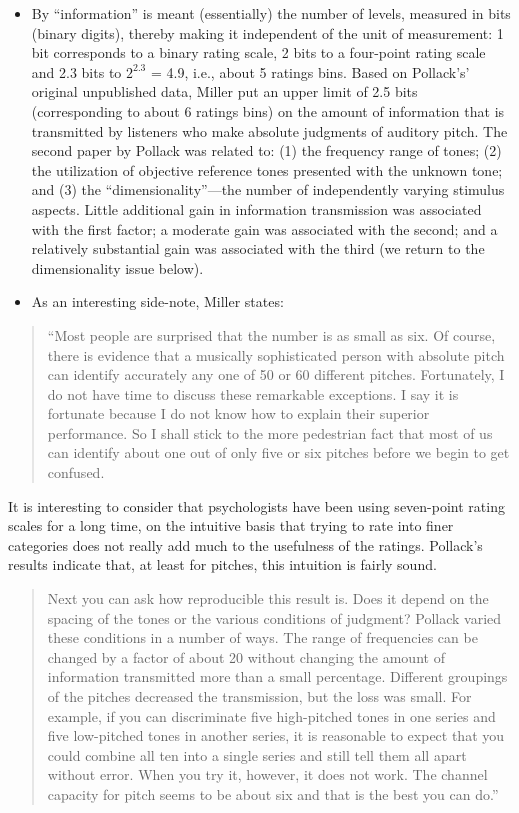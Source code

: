 \documentclass[
]{book}
\begin{document}
\begin{itemize}
\item
  By ``information'' is meant (essentially) the number of levels, measured in bits (binary digits), thereby making it independent of the unit of measurement: 1 bit corresponds to a binary rating scale, 2 bits to a four-point rating scale and 2.3 bits to \(2^{2.3}\) = 4.9, i.e., about 5 ratings bins. Based on Pollack's' original unpublished data, Miller put an upper limit of 2.5 bits (corresponding to about 6 ratings bins) on the amount of information that is transmitted by listeners who make absolute judgments of auditory pitch. The second paper \citep[@][]{RN2474} by Pollack was related to: (1) the frequency range of tones; (2) the utilization of objective reference tones presented with the unknown tone; and (3) the ``dimensionality''---the number of independently varying stimulus aspects. Little additional gain in information transmission was associated with the first factor; a moderate gain was associated with the second; and a relatively substantial gain was associated with the third (we return to the dimensionality issue below).
\item
  As an interesting side-note, Miller states:
\end{itemize}

\begin{quote}
``Most people are surprised that the number is as small as six. Of course, there is evidence that a musically sophisticated person with absolute pitch can identify accurately any one of 50 or 60 different pitches. Fortunately, I do not have time to discuss these remarkable exceptions. I say it is fortunate because I do not know how to explain their superior performance. So I shall stick to the more pedestrian fact that most of us can identify about one out of only five or six pitches before we begin to get confused.
\end{quote}

It is interesting to consider that psychologists have been using seven-point rating scales for a long time, on the intuitive basis that trying to rate into finer categories does not really add much to the usefulness of the ratings. Pollack's results indicate that, at least for pitches, this intuition is fairly sound.

\begin{quote}
Next you can ask how reproducible this result is. Does it depend on the spacing of the tones or the various conditions of judgment? Pollack varied these conditions in a number of ways. The range of frequencies can be changed by a factor of about 20 without changing the amount of information transmitted more than a small percentage. Different groupings of the pitches decreased the transmission, but the loss was small. For example, if you can discriminate five high-pitched tones in one series and five low-pitched tones in another series, it is reasonable to expect that you could combine all ten into a single series and still tell them all apart without error. When you try it, however, it does not work. The channel capacity for pitch seems to be about six and that is the best you can do.''
\end{quote}
\end{document}
